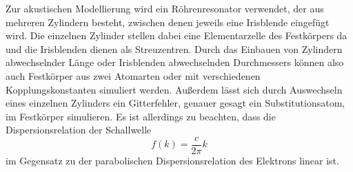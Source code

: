 Zur akustischen Modellierung wird ein Röhrenresonator verwendet, der aus mehreren Zylindern besteht, zwischen denen jeweils eine Irisblende eingefügt wird. Die einzelnen Zylinder stellen dabei eine Elementarzelle des Festkörpers da und die Irisblenden dienen als Streuzentren. Durch das Einbauen von Zylindern abwechselnder Länge oder Irisblenden abwechselnden Durchmessers können also auch Festkörper aus zwei Atomarten oder mit verschiedenen Kopplungskonstanten simuliert werden. Außerdem lässt sich durch Auswechseln eines einzelnen Zylinders ein Gitterfehler, genauer gesagt ein Substitutionsatom, im Festkörper simulieren. Es ist allerdings zu beachten, dass die Dispersionsrelation der Schallwelle
\begin{equation}
  f (k) = \frac{c}{2\pi} k
  \label{eq:dispersion_schall}
\end{equation}
im Gegensatz zu der parabolischen Dispersionsrelation des Elektrons linear ist.
